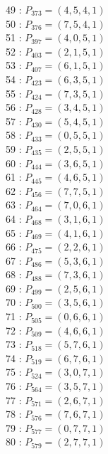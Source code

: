 \documentclass{article}
\begin{document}
{\begin{multicols}{3}
49 : $P_{373}=( 4, 5, 4, 1 )$\\
50 : $P_{376}=( 7, 5, 4, 1 )$\\
51 : $P_{397}=( 4, 0, 5, 1 )$\\
52 : $P_{403}=( 2, 1, 5, 1 )$\\
53 : $P_{407}=( 6, 1, 5, 1 )$\\
54 : $P_{423}=( 6, 3, 5, 1 )$\\
55 : $P_{424}=( 7, 3, 5, 1 )$\\
56 : $P_{428}=( 3, 4, 5, 1 )$\\
57 : $P_{430}=( 5, 4, 5, 1 )$\\
58 : $P_{433}=( 0, 5, 5, 1 )$\\
59 : $P_{435}=( 2, 5, 5, 1 )$\\
60 : $P_{444}=( 3, 6, 5, 1 )$\\
61 : $P_{445}=( 4, 6, 5, 1 )$\\
62 : $P_{456}=( 7, 7, 5, 1 )$\\
63 : $P_{464}=( 7, 0, 6, 1 )$\\
64 : $P_{468}=( 3, 1, 6, 1 )$\\
65 : $P_{469}=( 4, 1, 6, 1 )$\\
66 : $P_{475}=( 2, 2, 6, 1 )$\\
67 : $P_{486}=( 5, 3, 6, 1 )$\\
68 : $P_{488}=( 7, 3, 6, 1 )$\\
69 : $P_{499}=( 2, 5, 6, 1 )$\\
70 : $P_{500}=( 3, 5, 6, 1 )$\\
71 : $P_{505}=( 0, 6, 6, 1 )$\\
72 : $P_{509}=( 4, 6, 6, 1 )$\\
73 : $P_{518}=( 5, 7, 6, 1 )$\\
74 : $P_{519}=( 6, 7, 6, 1 )$\\
75 : $P_{524}=( 3, 0, 7, 1 )$\\
76 : $P_{564}=( 3, 5, 7, 1 )$\\
77 : $P_{571}=( 2, 6, 7, 1 )$\\
78 : $P_{576}=( 7, 6, 7, 1 )$\\
79 : $P_{577}=( 0, 7, 7, 1 )$\\
80 : $P_{579}=( 2, 7, 7, 1 )$\\
\end{multicols}


%


%


}%
\end{document}
